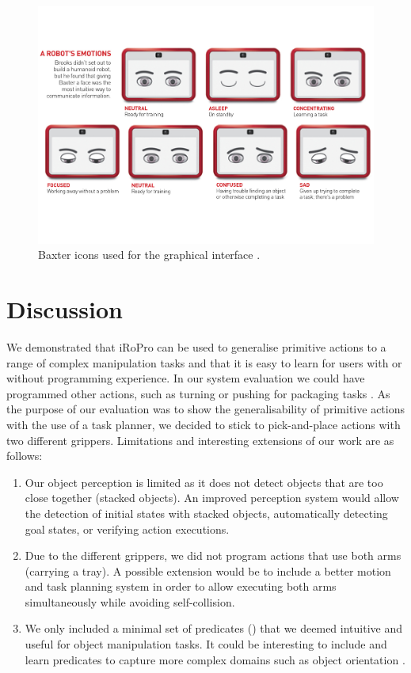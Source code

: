 \begin{figure}
	\centering
	\includegraphics[width=\linewidth]{Fig14.pdf}
	\caption{Baxter icons used for the graphical interface \cite{baxteremojis}.}
	\label{fig:baxter-icons}
\end{figure}

\section{Discussion}
\label{sec:discussion}
We demonstrated that iRoPro can be used to generalise primitive actions to a range of complex manipulation tasks and that it is easy to learn for users with or without programming experience.
In our system evaluation we could have programmed other actions, such as turning or pushing for packaging tasks \cite{liang2018c}.
As the purpose of our evaluation was to show the generalisability of primitive actions with the use of a task planner, we decided to stick to pick-and-place actions with two different grippers. 
Limitations and interesting extensions of our work are as follows:
\begin{enumerate}
	\item Our object perception is limited as it does not detect objects that are too close together (\eg stacked objects).
	An improved perception system would allow the detection of initial states with stacked objects, automatically detecting goal states, or verifying action executions.
	\item Due to the different grippers, we did not program actions that use both arms (\eg carrying a tray). A possible extension would be to include a better motion and task planning system in order to allow executing both arms simultaneously while avoiding self-collision.
	\item We only included a minimal set of predicates () that we deemed intuitive and useful for object manipulation tasks.
	It could be interesting to include and learn predicates to capture more complex domains such as object orientation \cite{li2016learning}.
\end{enumerate}


